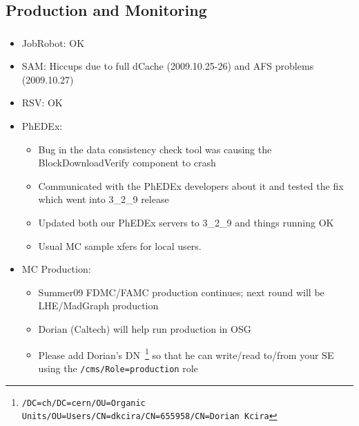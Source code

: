 \documentclass{beamer}
\begin{document}
\subsection{Production and Monitoring}
\begin{frame}
\frametitle{}
\begin{itemize}
	\item JobRobot: OK
	\item SAM: Hiccups due to full dCache (2009.10.25-26) and AFS problems (2009.10.27)
	\item RSV: OK
	\item PhEDEx:
	\begin{itemize}
		\item Bug in the data consistency check tool was causing the BlockDownloadVerify component to crash
		\item Communicated with the PhEDEx developers about it and tested the fix which went into 3\_2\_9 release
		\item Updated both our PhEDEx servers to 3\_2\_9 and things running OK
		\item Usual MC sample xfers for local users.
	\end{itemize}
	\item MC Production:
	\begin{itemize}
		\item Summer09 FDMC/FAMC production continues; next round will be LHE/MadGraph production
		\item Dorian (Caltech) will help run production in OSG
		\item Please add Dorian's DN~\footnote{{\tt {\tiny /DC=ch/DC=cern/OU=Organic Units/OU=Users/CN=dkcira/CN=655958/CN=Dorian Kcira}}} so that he can write/read to/from your SE using the {\tt /cms/Role=production} role
	\end{itemize}
\end{itemize}
\end{frame}
\end{document}
